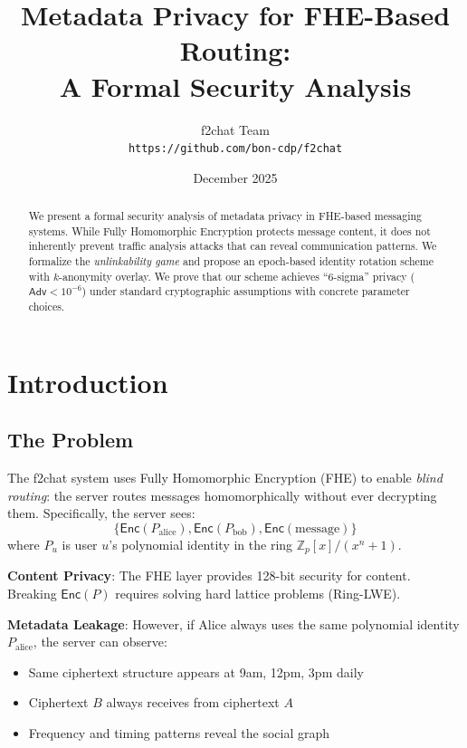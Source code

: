 \documentclass[11pt]{article}
\title{Metadata Privacy for FHE-Based Routing:\\
A Formal Security Analysis}
\author{f2chat Team\\
\small\texttt{https://github.com/bon-cdp/f2chat}}
\date{December 2025}
\newcommand{\Enc}{\mathsf{Enc}}
\newcommand{\Adv}{\mathsf{Adv}}
\newcommand{\Ring}{\mathbb{Z}_p[x]/(x^n+1)}
\begin{document}
\maketitle

\begin{abstract}
We present a formal security analysis of metadata privacy in FHE-based messaging systems.
While Fully Homomorphic Encryption protects message content, it does not inherently prevent
traffic analysis attacks that can reveal communication patterns. We formalize the
\emph{unlinkability game} and propose an epoch-based identity rotation scheme with
$k$-anonymity overlay. We prove that our scheme achieves ``6-sigma'' privacy
($\Adv < 10^{-6}$) under standard cryptographic assumptions with concrete parameter choices.
\end{abstract}

\section{Introduction}

\subsection{The Problem}

The f2chat system uses Fully Homomorphic Encryption (FHE) to enable \emph{blind routing}:
the server routes messages homomorphically without ever decrypting them. Specifically,
the server sees:
\[
\{\Enc(P_{\text{alice}}), \Enc(P_{\text{bob}}), \Enc(\text{message})\}
\]
where $P_u$ is user $u$'s polynomial identity in the ring $\Ring$.

\textbf{Content Privacy}: The FHE layer provides 128-bit security for content.
Breaking $\Enc(P)$ requires solving hard lattice problems (Ring-LWE).

\textbf{Metadata Leakage}: However, if Alice always uses the same polynomial identity
$P_{\text{alice}}$, the server can observe:
\begin{itemize}
    \item Same ciphertext structure appears at 9am, 12pm, 3pm daily
    \item Ciphertext $B$ always receives from ciphertext $A$
    \item Frequency and timing patterns reveal the social graph
\end{itemize}
\end{document}
